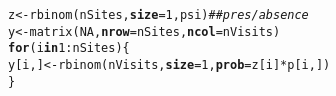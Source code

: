 \documentclass[color=usenames,dvipsnames]{beamer}\usepackage[]{graphicx}\usepackage[]{color}
\makeatletter
\newcommand{\hlnum}[1]{\textcolor[rgb]{0.69,0.494,0}{#1}}%
\newcommand{\hlcom}[1]{\textcolor[rgb]{0.514,0.506,0.514}{\textit{#1}}}%
\newcommand{\hlopt}[1]{\textcolor[rgb]{0,0,0}{#1}}%
\newcommand{\hlstd}[1]{\textcolor[rgb]{0,0,0}{#1}}%
\newcommand{\hlkwa}[1]{\textcolor[rgb]{0,0,0}{\textbf{#1}}}%
\newcommand{\hlkwb}[1]{\textcolor[rgb]{0,0.341,0.682}{#1}}%
\newcommand{\hlkwc}[1]{\textcolor[rgb]{0,0,0}{\textbf{#1}}}%
\newcommand{\hlkwd}[1]{\textcolor[rgb]{0.004,0.004,0.506}{#1}}%
\newenvironment{kframe}{%
 \def\at@end@of@kframe{}%
 \ifinner\ifhmode%
  \def\at@end@of@kframe{\end{minipage}}%
  \begin{minipage}{\columnwidth}%
 \fi\fi%
 \def\FrameCommand##1{\hskip\@totalleftmargin \hskip-\fboxsep
 \colorbox{shadecolor}{##1}\hskip-\fboxsep
     \hskip-\linewidth \hskip-\@totalleftmargin \hskip\columnwidth}%
 \MakeFramed {\advance\hsize-\width
   \@totalleftmargin\z@ \linewidth\hsize
   \@setminipage}}%
 {\par\unskip\endMakeFramed%
 \at@end@of@kframe}
\newenvironment{knitrout}{}{} %
\makeatother
\begin{document}
\begin{frame}[fragile]
\begin{enumerate}[<+->]
\begin{knitrout}
\begin{kframe}
\begin{alltt}
\hlstd{z} \hlkwb{<-} \hlkwd{rbinom}\hlstd{(nSites,} \hlkwc{size}\hlstd{=}\hlnum{1}\hlstd{, psi)}            \hlcom{## pres/absence}
\hlstd{y} \hlkwb{<-} \hlkwd{matrix}\hlstd{(}\hlnum{NA}\hlstd{,} \hlkwc{nrow}\hlstd{=nSites,} \hlkwc{ncol}\hlstd{=nVisits)}
\hlkwa{for}\hlstd{(i} \hlkwa{in} \hlnum{1}\hlopt{:}\hlstd{nSites) \{}
    \hlstd{y[i,]} \hlkwb{<-} \hlkwd{rbinom}\hlstd{(nVisits,} \hlkwc{size}\hlstd{=}\hlnum{1}\hlstd{,} \hlkwc{prob}\hlstd{=z[i]}\hlopt{*}\hlstd{p[i,])}
\hlstd{\}}
\end{alltt}
\end{kframe}
\end{knitrout}
\end{enumerate}
\end{frame}
\end{document}
